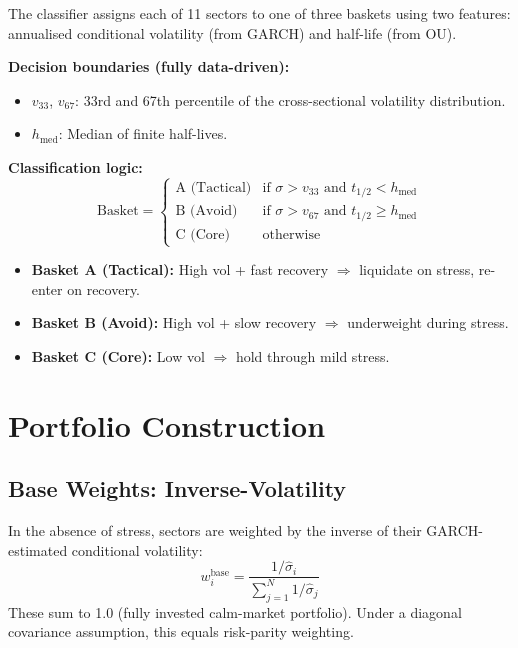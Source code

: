 \documentclass[11pt,a4paper]{article}
\begin{document}
The classifier assigns each of 11 sectors to one of three baskets using two features: annualised conditional volatility (from GARCH) and half-life (from OU).

\textbf{Decision boundaries (fully data-driven):}
\begin{itemize}[nosep]
  \item $v_{33}$, $v_{67}$: 33rd and 67th percentile of the cross-sectional volatility distribution.
  \item $h_{\mathrm{med}}$: Median of finite half-lives.
\end{itemize}

\textbf{Classification logic:}
\begin{equation}
  \mathrm{Basket} = \begin{cases}
    \text{A (Tactical)} & \text{if } \sigma > v_{33} \text{ and } t_{1/2} < h_{\mathrm{med}} \\
    \text{B (Avoid)}    & \text{if } \sigma > v_{67} \text{ and } t_{1/2} \ge h_{\mathrm{med}} \\
    \text{C (Core)}     & \text{otherwise}
  \end{cases}
\end{equation}

\begin{itemize}[nosep]
  \item \textbf{Basket A (Tactical):} High vol + fast recovery $\Rightarrow$ liquidate on stress, re-enter on recovery.
  \item \textbf{Basket B (Avoid):} High vol + slow recovery $\Rightarrow$ underweight during stress.
  \item \textbf{Basket C (Core):} Low vol $\Rightarrow$ hold through mild stress.
\end{itemize}

\section{Portfolio Construction}
\label{sec:portfolio}

\subsection{Base Weights: Inverse-Volatility}

In the absence of stress, sectors are weighted by the inverse of their GARCH-estimated conditional volatility:
\begin{equation}
  w_i^{\mathrm{base}} = \frac{1/\hat{\sigma}_i}{\sum_{j=1}^{N} 1/\hat{\sigma}_j}
\end{equation}
These sum to 1.0 (fully invested calm-market portfolio). Under a diagonal covariance assumption, this equals risk-parity weighting.
\end{document}
